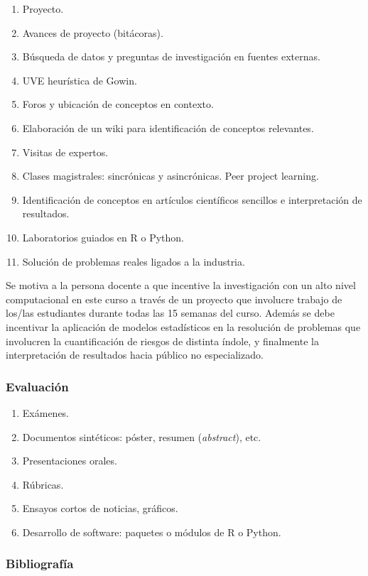 \begin{refsection}
\begin{enumerate}
\item Proyecto.
\item Avances de proyecto (bitácoras).
\item Búsqueda de datos y preguntas de investigación en fuentes externas.
\item UVE heurística de Gowin.
\item Foros y ubicación de conceptos en contexto.
\item Elaboración de un wiki para identificación de conceptos relevantes.
\item Visitas de expertos.
\item Clases magistrales: sincrónicas y asincrónicas. Peer project learning.
\item Identificación de conceptos en artículos científicos sencillos e interpretación de resultados.
\item Laboratorios guiados en R o Python.
\item Solución de problemas reales ligados a la industria.
\end{enumerate}

Se motiva a la persona docente a que incentive la investigación con un alto nivel computacional en este curso a través de un proyecto que involucre trabajo de los/las estudiantes durante todas las 15 semanas del curso. Además se debe incentivar la aplicación de modelos estadísticos en la resolución de problemas que involucren la cuantificación de riesgos de distinta índole, y finalmente la interpretación de resultados hacia público no especializado.

\subsubsection*{Evaluación}

\begin{enumerate}
\item Exámenes.
\item Documentos sintéticos: póster, resumen (\emph{abstract}), etc.
\item Presentaciones orales.
\item Rúbricas.
\item Ensayos cortos de noticias, gráficos.
\item Desarrollo de software: paquetes o módulos de R o Python.
\end{enumerate}

\subsubsection*{Bibliografía}


\end{refsection}
